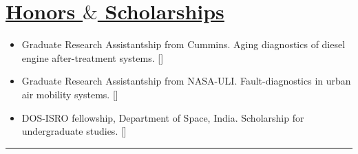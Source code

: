 \section*{\underline{Honors $\&$ Scholarships}}
\begin{itemize}
        \item Graduate Research Assistantship from Cummins. Aging diagnostics of diesel engine after-treatment systems.
        []
        \item Graduate Research Assistantship from NASA-ULI. Fault-diagnostics in urban air mobility systems.
        []
        \item DOS-ISRO fellowship, Department of Space, India. Scholarship for undergraduate studies.
        []
\end{itemize}
\noindent\rule{\textwidth}{0.4pt}
